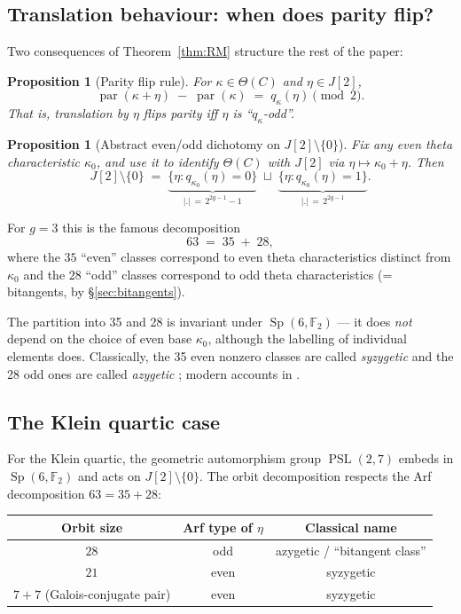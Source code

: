 \documentclass[11pt]{amsart}
\theoremstyle{plain}
\newtheorem{proposition}[theorem]{Proposition}
\theoremstyle{definition}
\theoremstyle{remark}
\newcommand{\Sp}{\operatorname{Sp}}
\newcommand{\Parity}{\operatorname{par}}
\newcommand{\PSL}{\operatorname{PSL}}
\newcommand{\F}{\mathbb F}
\begin{document}
\subsection{Translation behaviour: when does parity flip?}

Two consequences of Theorem~\ref{thm:RM} structure the rest of the paper:

\begin{proposition}[Parity flip rule]
For $\kappa \in \Theta(C)$ and $\eta \in J[2]$,
\[
  \Parity(\kappa + \eta) \;-\; \Parity(\kappa) \;=\; q_\kappa(\eta) \pmod 2.
\]
That is, translation by $\eta$ flips parity iff $\eta$ is ``$q_\kappa$-odd''.
\end{proposition}

\begin{proposition}[{Abstract even/odd dichotomy on $J[2] \setminus \{0\}$}]
Fix any even theta characteristic $\kappa_0$, and use it to identify
$\Theta(C)$ with $J[2]$ via $\eta \mapsto \kappa_0 + \eta$. Then
\[
  J[2] \setminus \{0\} \;=\;
  \underbrace{\{\eta : q_{\kappa_0}(\eta) = 0\}}_{|.|\,=\,2^{2g-1} - 1}
  \;\sqcup\;
  \underbrace{\{\eta : q_{\kappa_0}(\eta) = 1\}}_{|.|\,=\,2^{2g-1}}.
\]
\end{proposition}

For $g = 3$ this is the famous decomposition
\[
  63 \;=\; 35 \;+\; 28,
\]
where the $35$ ``even'' classes correspond to even theta characteristics
distinct from $\kappa_0$ and the $28$ ``odd'' classes correspond to odd theta
characteristics (= bitangents, by \S\ref{sec:bitangents}).

The partition into 35 and 28 is invariant under $\Sp(6, \F_2)$ --- it does
\emph{not} depend on the choice of even base $\kappa_0$, although the
labelling of individual elements does. Classically, the 35 even nonzero
classes are called \emph{syzygetic} and the 28 odd ones are called
\emph{azygetic} \cite[\S 219]{Salmon1879}; modern accounts in
\cite{DolgachevOrtland1988,Dolgachev2012}.

\subsection{The Klein quartic case}

For the Klein quartic, the geometric automorphism group $\PSL(2,7)$ embeds
in $\Sp(6, \F_2)$ and acts on $J[2] \setminus \{0\}$. The orbit decomposition
respects the Arf decomposition $63 = 35 + 28$:

\begin{center}
\begin{tabular}{ccc}
\toprule
Orbit size & Arf type of $\eta$ & Classical name \\
\midrule
$28$ & odd & azygetic / ``bitangent class'' \\
$21$ & even & syzygetic \\
$7 + 7$ (Galois-conjugate pair) & even & syzygetic \\
\bottomrule
\end{tabular}
\end{center}
\end{document}
